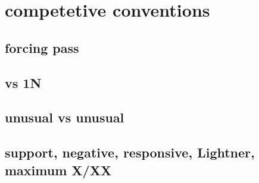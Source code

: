 \section{competetive conventions}

\subsection{forcing pass}


\subsection{vs 1N}

\subsection{unusual vs unusual}

\subsection{support, negative, responsive, Lightner, maximum X/XX}
